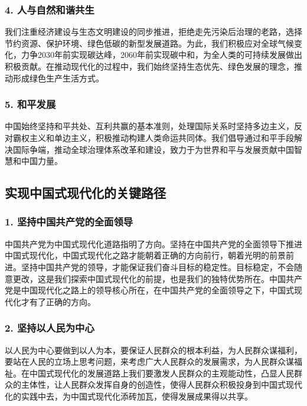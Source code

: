 \documentclass[12pt]{article}
\begin{document}
\subsubsection*{4. 人与自然和谐共生}

我们注重经济建设与生态文明建设的同步推进，拒绝走先污染后治理的老路，选择节约资源、保护环境、绿色低碳的新型发展道路。为此，我们积极应对全球气候变化，力争2030年前实现碳达峰，2060年前实现碳中和，为全人类的可持续发展做出积极贡献。在推动现代化的过程中，我们始终坚持生态优先、绿色发展的理念，推动形成绿色生产生活方式。

\subsubsection*{5. 和平发展}

中国始终坚持和平共处、互利共赢的基本准则，处理国际关系时坚持多边主义，反对霸权主义和单边主义，积极推动构建人类命运共同体。我们倡导通过和平手段解决国际争端，推动全球治理体系改革和建设，致力于为世界和平与发展贡献中国智慧和中国力量。

\subsection*{实现中国式现代化的关键路径}

\subsubsection*{1. 坚持中国共产党的全面领导}

中国共产党为中国式现代化道路指明了方向。坚持在中国共产党的全面领导下推进中国式现代化，中国式现代化之路才能朝着正确的方向前行，朝着光明的前景前进。坚持中国共产党的领导，才能保证我们奋斗目标的稳定性。目标稳定，不会随意更改，这是我们探索中国式现代化的前提，也是我们的独特优势所在。中国共产党是中国现代化之路上的领导核心所在，在中国共产党的全面领导之下，中国式现代化才有了正确的方向。

\subsubsection*{2. 坚持以人民为中心}

以人民为中心要做到以人为本，要保证人民群众的根本利益，为人民群众谋福利，要站在人民的立场上思考问题，来考虑广大人民群众的发展需求，为人民群众谋福祉。在中国式现代化的发展道路上我们要激发人民群众的主观能动性，凸显人民群众的主体性，让人民群众发挥自身的创造性，使得人民群众积极投身到中国式现代化的实践中去，为中国式现代化添砖加瓦，使得发展成果得以共享。
\end{document}
